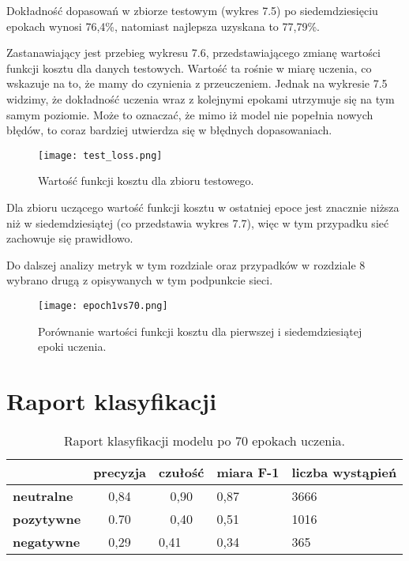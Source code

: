 Dokładność dopasowań w zbiorze testowym (wykres 7.5) po siedemdziesięciu epokach wynosi 76,4\%, natomiast najlepsza uzyskana to 77,79\%. 

Zastanawiający jest przebieg wykresu 7.6, przedstawiającego zmianę wartości funkcji kosztu dla danych testowych. Wartość ta rośnie w miarę uczenia, co wskazuje na to, że mamy do czynienia z przeuczeniem. Jednak na wykresie 7.5 widzimy, że dokładność uczenia wraz z kolejnymi epokami utrzymuje się na tym samym poziomie. Może to oznaczać, że mimo iż model nie popełnia nowych błędów, to coraz bardziej utwierdza się w błędnych dopasowaniach.


 \label{sec:etykiety}
\begin{figure}[H]
    \centering
    \texttt{[image: test\_loss.png]}
    \caption{Wartość funkcji kosztu dla zbioru testowego.}
\end{figure}

Dla zbioru uczącego wartość funkcji kosztu w ostatniej epoce jest znacznie niższa niż w siedemdziesiątej (co przedstawia wykres 7.7), więc w tym przypadku sieć zachowuje się prawidłowo.

Do dalszej analizy metryk w tym rozdziale oraz przypadków w rozdziale 8 wybrano drugą z opisywanych w tym podpunkcie sieci.

 \label{sec:etykiety}
\begin{figure}[H]
    \centering
    \texttt{[image: epoch1vs70.png]}
    \caption{Porównanie wartości funkcji kosztu dla pierwszej i siedemdziesiątej epoki uczenia.}
\end{figure}
 
\section{Raport klasyfikacji}
\label{cha:wyniki}

\begin{table}[H]
\centering
\begin{tabular}{|lllll|}
\hline
\multicolumn{1}{|l|}{\textbf{}}               & \multicolumn{1}{c|}{\textbf{precyzja}} & \multicolumn{1}{c|}{\textbf{czułość}} & \multicolumn{1}{l|}{\textbf{miara F-1}} & \textbf{liczba wystąpień} \\ \hline
\multicolumn{1}{|l|}{\textbf{neutralne}}      & \multicolumn{1}{c|}{0,84}              & \multicolumn{1}{c|}{0,90}         & \multicolumn{1}{l|}{0,87}               & 3666                      \\ \hline
\multicolumn{1}{|l|}{\textbf{pozytywne}}      & \multicolumn{1}{c|}{0.70}              & \multicolumn{1}{c|}{0,40}         & \multicolumn{1}{l|}{0,51}               & 1016                      \\ \hline
\multicolumn{1}{|l|}{\textbf{negatywne}}      & \multicolumn{1}{c|}{0,29}              & \multicolumn{1}{l|}{0,41}         & \multicolumn{1}{l|}{0,34}               & 365                       \\ \hline
\end{tabular}
\caption{Raport klasyfikacji modelu po 70 epokach uczenia.}
\label{table:bf-sa}
\end{table}

